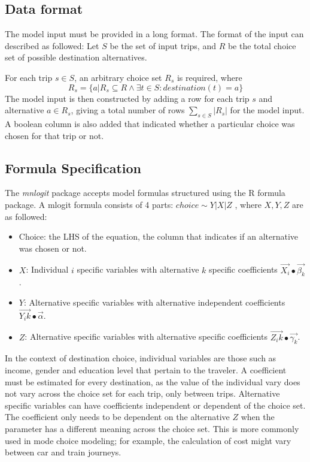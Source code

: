 \subsection*{Data format}
The model input must be provided in a long format. The format of the input can described as followed:
Let \(S\)  be the set of input trips, and \(R\)  be the total choice set of possible destination alternatives. 

For each trip $s \in S$, an arbitrary choice set $R_s$ is required, where
$$ R_s  =  \{a | R_s \subseteq R \wedge \exists t \in S : destination(t) = a \} $$ 
The model input is then constructed by adding a row for each trip $s$ and alternative $a \in R_s$, giving a total number of rows  $ \sum_{s \in S} |R_s| $  for the model input. A boolean column is also added that indicated whether a particular choice was chosen for that trip or not.

\subsection*{Formula Specification}
The \textit{mnlogit} package accepts model formulas structured using the R formula package. A mlogit formula consists of 4 parts: $ choice \sim Y | X | Z $ , where $X,Y,Z$ are as followed:

\begin{itemize}
	\item Choice: the LHS of the equation, the column that indicates if an alternative was chosen or not.
	\item $X$: Individual $i$ specific variables with alternative $k$ specific coefficients $\vec{X_i} ∙\vec{\beta_k}$.

	\item $Y$: Alternative specific variables with alternative independent coefficients $\vec{Y_ik} ∙\vec{\alpha}$. 
	\item $Z$: Alternative specific variables with alternative specific coefficients
$\vec{Z_ik} ∙\vec{\gamma_k}$.
\end{itemize}

In the context of destination choice, individual variables are those such as income, gender and education level that pertain to the traveler. A coefficient must be estimated for every destination, as the value of the individual vary does not vary across the choice set for each trip, only between trips. Alternative specific variables can have coefficients independent or dependent of the choice set. The coefficient only needs to be dependent on the alternative $Z$ when the parameter has a different meaning across the choice set. This is more commonly used in mode choice modeling; for example, the calculation of cost might vary between car and train journeys.

